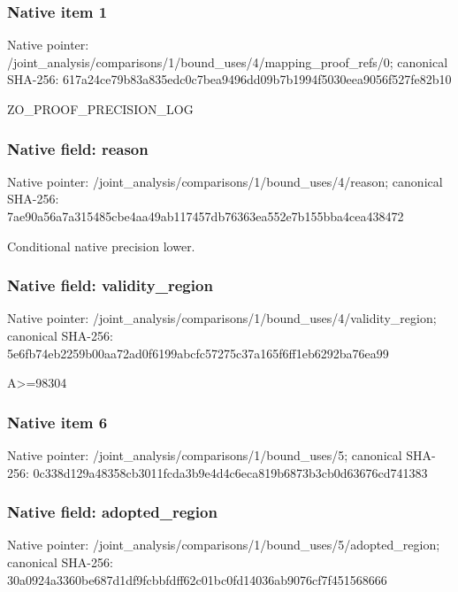 \documentclass[10pt,a4paper]{article}
\begin{document}
\subsubsection{Native item 1}
Native pointer: /joint\_\allowbreak{}analysis/comparisons/1/bound\_\allowbreak{}uses/4/mapping\_\allowbreak{}proof\_\allowbreak{}refs/0; canonical SHA-256: 617a24ce79b83a835edc0c7bea9496dd09b7b1994f5030eea9056f527fe82b10

\begingroup\raggedright\sloppy ZO\_\allowbreak{}PROOF\_\allowbreak{}PRECISION\_\allowbreak{}LOG\par\endgroup

\subsubsection{Native field: reason}
Native pointer: /joint\_\allowbreak{}analysis/comparisons/1/bound\_\allowbreak{}uses/4/reason; canonical SHA-256: 7ae90a56a7a315485cbe4aa49ab117457db76363ea552e7b155bba4cea438472

\begingroup\raggedright\sloppy Conditional native precision lower.\par\endgroup

\subsubsection{Native field: validity\_\allowbreak{}region}
Native pointer: /joint\_\allowbreak{}analysis/comparisons/1/bound\_\allowbreak{}uses/4/validity\_\allowbreak{}region; canonical SHA-256: 5e6fb74eb2259b00aa72ad0f6199abcfc57275c37a165f6ff1eb6292ba76ea99

\begingroup\raggedright\sloppy A>=\allowbreak{}98304\par\endgroup

\subsubsection{Native item 6}
Native pointer: /joint\_\allowbreak{}analysis/comparisons/1/bound\_\allowbreak{}uses/5; canonical SHA-256: 0c338d129a48358cb3011fcda3b9e4d4c6eca819b6873b3cb0d63676cd741383

\subsubsection{Native field: adopted\_\allowbreak{}region}
Native pointer: /joint\_\allowbreak{}analysis/comparisons/1/bound\_\allowbreak{}uses/5/adopted\_\allowbreak{}region; canonical SHA-256: 30a0924a3360be687d1df9fcbbfdff62c01bc0fd14036ab9076cf7f451568666
\end{document}

